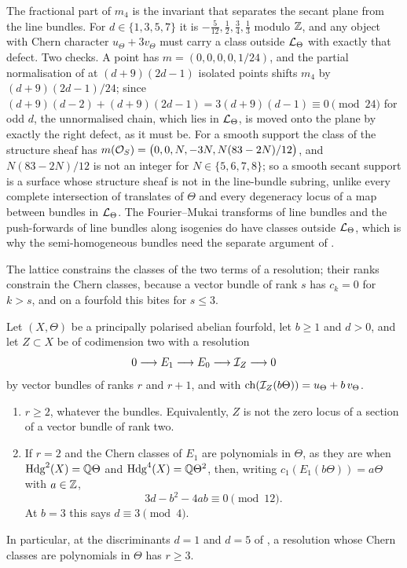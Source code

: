 \begin{remark}\label{rem:latticedefect}
The fractional part of $m_{4}$ is the invariant that separates the secant
plane from the line bundles. For $d\in\{1,3,5,7\}$ it is
$-\tfrac{5}{12},\tfrac12,\tfrac34,\tfrac13$ modulo $\mathbb{Z}$, and any object with
Chern character $u_{\Theta}+3v_{\Theta}$ must carry a class outside
$\mathcal{L}_{\Theta}$ with exactly that defect. Two checks. A point has
$m=(0,0,0,0,1/24)$, and the partial normalisation of  at
$(d+9)(2d-1)$ isolated points shifts $m_{4}$ by $(d+9)(2d-1)/24$; since
$(d+9)(d-2)+(d+9)(2d-1)=3(d+9)(d-1)\equiv0\pmod{24}$ for odd $d$, the
unnormalised chain, which lies in $\mathcal{L}_{\Theta}$, is moved onto the plane by
exactly the right defect, as it must be. For a smooth support the class of
the structure sheaf has $m(\mathcal{O}_{S})=\bigl(0,0,N,-3N,N(83-2N)/12\bigr)$, and
$N(83-2N)/12$ is not an integer for $N\in\{5,6,7,8\}$; so a smooth secant
support is a surface whose structure sheaf is not in the line-bundle
subring, unlike every complete intersection of translates of $\Theta$ and
every degeneracy locus of a map between bundles in $\mathcal{L}_{\Theta}$. The
Fourier--Mukai transforms of line bundles and the push-forwards of line
bundles along isogenies do have classes outside $\mathcal{L}_{\Theta}$, which is why
the semi-homogeneous bundles need the separate argument of
.
\end{remark}

The lattice constrains the classes of the two terms of a resolution; their
ranks constrain the Chern classes, because a vector bundle of rank $s$ has
$c_{k}=0$ for $k>s$, and on a fourfold this bites for $s\le3$.

\begin{proposition}\label{prop:lowrankburch}
Let $(X,\Theta)$ be a principally polarised abelian fourfold, let $b\ge1$
and $d>0$, and let $Z\subset X$ be of codimension two with a resolution
\[
  0\longrightarrow E_{1}\longrightarrow E_{0}\longrightarrow\mathcal{I}_{Z}
  \longrightarrow0
\]
by vector bundles of ranks $r$ and $r+1$, and with
$\operatorname{ch}(\mathcal{I}_{Z}(b\Theta))=u_{\Theta}+b\,v_{\Theta}$.
\begin{enumerate}[label=\textup{(\roman*)},nosep,leftmargin=2.2em]
\item $r\ge2$, whatever the bundles. Equivalently, $Z$ is not the zero locus
  of a section of a vector bundle of rank two.
\item If $r=2$ and the Chern classes of $E_{1}$ are polynomials in $\Theta$,
  as they are when $\mathrm{Hdg}^{2}(X)=\mathbb{Q}\Theta$ and $\mathrm{Hdg}^{4}(X)=\mathbb{Q}\Theta^{2}$,
  then, writing $c_{1}(E_{1}(b\Theta))=a\Theta$ with $a\in\mathbb{Z}$,
  \[
    3d-b^{2}-4ab\equiv0\pmod{12}.
  \]
  At $b=3$ this says $d\equiv3\pmod4$.
\end{enumerate}
In particular, at the discriminants $d=1$ and $d=5$ of
, a resolution whose Chern classes are
polynomials in $\Theta$ has $r\ge3$.
\end{proposition}

